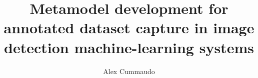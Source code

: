 \title{Metamodel development for annotated dataset capture in image detection machine-learning systems}
\author{Alex Cummaudo}